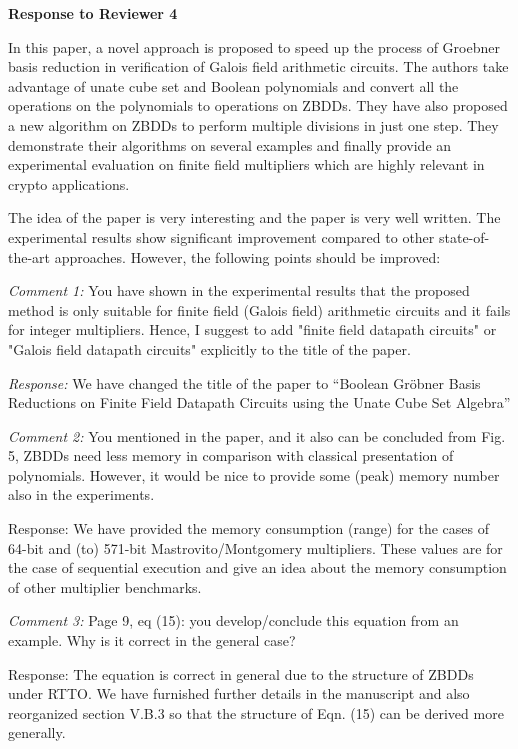 \documentclass[conference, onecolumn]{IEEEtran}
\begin{document}
\begin{center}
{\bf \large Response to Reviewer 4}
\end{center}  
\vspace{0.1in}
\par In this paper, a novel approach is proposed to speed up the process of Groebner basis reduction in verification of Galois field arithmetic circuits. The authors take advantage of unate cube set and Boolean polynomials and convert all the operations on the polynomials to operations on ZBDDs. They have also proposed a new algorithm on ZBDDs to perform multiple divisions in just one step. They demonstrate their algorithms on several examples and finally provide an experimental evaluation on finite field multipliers which are highly relevant in crypto applications.
\par The idea of the paper is very interesting and the paper is very well written. The experimental results show significant improvement compared to other state-of-the-art approaches. However, the following points should be improved:
\par{\it Comment 1:} You have shown in the experimental results that the proposed method is only suitable for finite field (Galois field) arithmetic circuits and it fails for integer multipliers. Hence, I suggest to add "finite field datapath circuits" or "Galois field datapath circuits" explicitly to the title of the paper.
\par{\it Response: } We have changed the title of the paper to ``Boolean Gr\"obner Basis Reductions on Finite Field Datapath Circuits using the Unate Cube Set Algebra''

\par{\it Comment 2:} You mentioned in the paper, and it also can be concluded from Fig. 5, ZBDDs need less memory in comparison with classical presentation of polynomials. However, it would be nice to provide some (peak) memory number also in the experiments.
\par{Response: } We have provided the memory consumption (range) for the cases of 64-bit and (to) 571-bit Mastrovito/Montgomery multipliers.
These values are for the case of sequential execution and give an idea about the memory consumption of other multiplier benchmarks. 

\par{\it Comment 3:} Page 9, eq (15): you develop/conclude this equation from an example. Why is it correct in the general case?
\par{Response:} The equation is correct in general due to the
structure of ZBDDs under RTTO. We have furnished further details in
the manuscript and also reorganized section V.B.3 so that the
structure of Eqn. (15) can be derived more generally.
\end{document}
